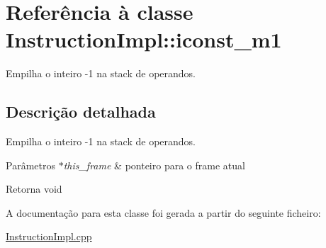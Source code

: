 \hypertarget{class_instruction_impl_1_1iconst__m1}{}\section{Referência à classe Instruction\+Impl\+:\+:iconst\+\_\+m1}
\label{class_instruction_impl_1_1iconst__m1}


Empilha o inteiro -\/1 na stack de operandos.  




\subsection{Descrição detalhada}
Empilha o inteiro -\/1 na stack de operandos. 


\begin{DoxyParams}{Parâmetros}
{\em $\ast$this\+\_\+frame} & ponteiro para o frame atual \\
\hline
\end{DoxyParams}
\begin{DoxyReturn}{Retorna}
void 
\end{DoxyReturn}


A documentação para esta classe foi gerada a partir do seguinte ficheiro\+:\begin{DoxyCompactItemize}
\item 
\hyperlink{_instruction_impl_8cpp}{Instruction\+Impl.\+cpp}\end{DoxyCompactItemize}
